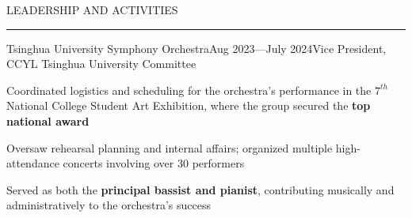 \documentclass{resume} %
\renewenvironment{rSection}[1]{
\sectionskip
\textcolor{TsinghuaPurple}{\MakeUppercase{#1}}
\sectionlineskip
\hrule
\begin{list}{}{
\setlength{\leftmargin}{0em}
}
\item[]
}{
\end{list}
}
\begin{document}





 
 \begin{rSection}{LEADERSHIP AND ACTIVITIES}

    \begin{rSubsection}{Tsinghua University Symphony Orchestra}{Aug 2023---July 2024}{Vice President, CCYL Tsinghua University Committee}{}              
    \item Coordinated logistics and scheduling for the orchestra's performance in the $7^{th}$ National College Student Art Exhibition, where the group secured the \textbf{top national award}
    \item Oversaw rehearsal planning and internal affairs; organized multiple high-attendance concerts involving over 30 performers
    \item Served as both the \textbf{principal bassist and pianist}, contributing musically and administratively to the orchestra’s success
    \end{rSubsection}  
    
    
    \end{rSection}
    
\end{document}
